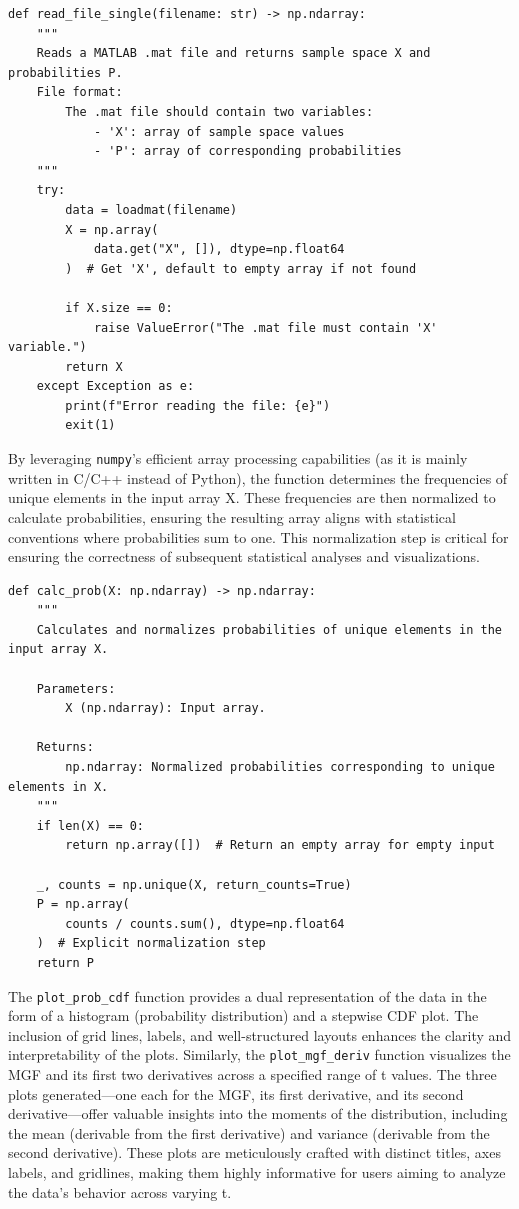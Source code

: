 \documentclass{article}
\begin{document}
\begin{verbatim}
def read_file_single(filename: str) -> np.ndarray:
    """
    Reads a MATLAB .mat file and returns sample space X and probabilities P.
    File format:
        The .mat file should contain two variables:
            - 'X': array of sample space values
            - 'P': array of corresponding probabilities
    """
    try:
        data = loadmat(filename)
        X = np.array(
            data.get("X", []), dtype=np.float64
        )  # Get 'X', default to empty array if not found

        if X.size == 0:
            raise ValueError("The .mat file must contain 'X' variable.")
        return X
    except Exception as e:
        print(f"Error reading the file: {e}")
        exit(1)
\end{verbatim}

By leveraging \texttt{numpy}'s efficient array processing capabilities (as it is mainly written in C/C++ instead of Python), the function determines the frequencies of unique elements in the input array X. These frequencies are then normalized to calculate probabilities, ensuring the resulting array aligns with statistical conventions where probabilities sum to one. This normalization step is critical for ensuring the correctness of subsequent statistical analyses and visualizations.

\begin{verbatim}
def calc_prob(X: np.ndarray) -> np.ndarray:
    """
    Calculates and normalizes probabilities of unique elements in the input array X.

    Parameters:
        X (np.ndarray): Input array.

    Returns:
        np.ndarray: Normalized probabilities corresponding to unique elements in X.
    """
    if len(X) == 0:
        return np.array([])  # Return an empty array for empty input

    _, counts = np.unique(X, return_counts=True)
    P = np.array(
        counts / counts.sum(), dtype=np.float64
    )  # Explicit normalization step
    return P
\end{verbatim}

The \texttt{plot\_prob\_cdf} function provides a dual representation of the data in the form of a histogram (probability distribution) and a stepwise CDF plot. The inclusion of grid lines, labels, and well-structured layouts enhances the clarity and interpretability of the plots. Similarly, the \texttt{plot\_mgf\_deriv} function visualizes the MGF and its first two derivatives across a specified range of t values. The three plots generated—one each for the MGF, its first derivative, and its second derivative—offer valuable insights into the moments of the distribution, including the mean (derivable from the first derivative) and variance (derivable from the second derivative). These plots are meticulously crafted with distinct titles, axes labels, and gridlines, making them highly informative for users aiming to analyze the data's behavior across varying t.
\end{document}
